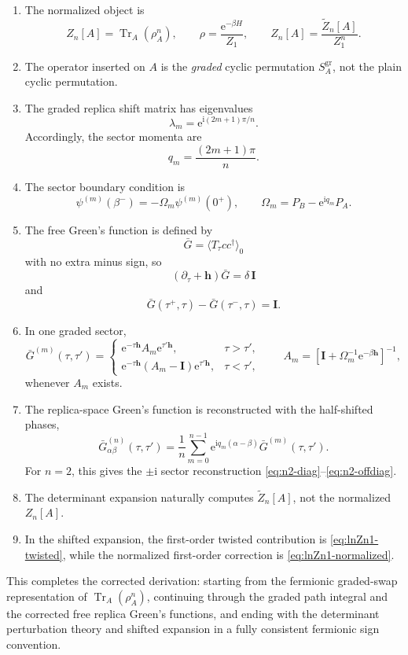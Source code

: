 \documentclass[11pt]{article}
\newcommand{\Tr}{\operatorname{Tr}}
\newcommand{\e}{\mathrm{e}}
\newcommand{\ii}{\mathrm{i}}
\newcommand{\1}{\mathds{1}}
\newcommand{\bh}{\bm{h}}
\newcommand{\bI}{\bm{I}}
\newcommand{\sq}[1]{\left[#1\right]}
\begin{document}
\begin{enumerate}[leftmargin=2.2em]
\item The normalized object is
\[
Z_n[A]=\Tr_A(\rho_A^n),\qquad
\rho=\frac{\e^{-\beta H}}{Z_1},
\qquad
Z_n[A]=\frac{\widetilde Z_n[A]}{Z_1^n}.
\]

\item The operator inserted on $A$ is the \emph{graded} cyclic permutation
$S_A^{\mathrm{gr}}$, not the plain cyclic permutation.

\item The graded replica shift matrix has eigenvalues
\[
\lambda_m=\e^{\ii(2m+1)\pi/n}.
\]
Accordingly, the sector momenta are
\[
q_m=\frac{(2m+1)\pi}{n}.
\]

\item The sector boundary condition is
\[
\psi^{(m)}(\beta^-)= -\Omega_m \psi^{(m)}(0^+),
\qquad
\Omega_m=P_B-\e^{\ii q_m}P_A.
\]

\item The free Green's function is defined by
\[
\bar G=\langle T_\tau c c^\dagger\rangle_0
\]
with no extra minus sign, so
\[
(\partial_\tau+\bh)\bar G=\delta\,\bI
\]
and
\[
\bar G(\tau^+,\tau)-\bar G(\tau^-,\tau)=\bI.
\]

\item In one graded sector,
\[
\bar G^{(m)}(\tau,\tau')
=
\begin{cases}
\e^{-\tau\bh}A_m\e^{\tau'\bh}, & \tau>\tau',\\[4pt]
\e^{-\tau\bh}(A_m-\bI)\e^{\tau'\bh}, & \tau<\tau',
\end{cases}
\qquad
A_m=\sq{\bI+\Omega_m^{-1}\e^{-\beta\bh}}^{-1},
\]
whenever $A_m$ exists.

\item The replica-space Green's function is reconstructed with the
half-shifted phases,
\[
\bar G_{\alpha\beta}^{(n)}(\tau,\tau')
=
\frac1n\sum_{m=0}^{n-1}\e^{\ii q_m(\alpha-\beta)}\bar G^{(m)}(\tau,\tau').
\]
For $n=2$, this gives the $\pm \ii$ sector reconstruction
\eqref{eq:n2-diag}--\eqref{eq:n2-offdiag}.

\item The determinant expansion naturally computes
$\widetilde Z_n[A]$, not the normalized $Z_n[A]$.

\item In the shifted expansion, the first-order twisted contribution is
\eqref{eq:lnZn1-twisted}, while the normalized first-order correction is
\eqref{eq:lnZn1-normalized}.
\end{enumerate}

\bigskip
This completes the corrected derivation: starting from the fermionic
graded-swap representation of $\Tr_A(\rho_A^n)$, continuing through the
graded path integral and the corrected free replica Green's functions, and
ending with the determinant perturbation theory and shifted expansion in a
fully consistent fermionic sign convention.
\end{document}
